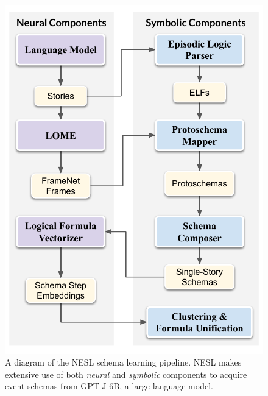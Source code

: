 



\begin{figure}
    \centering
    \includegraphics[]{figures/nesl/srw_architecture}
    \caption{A diagram of the NESL schema learning pipeline. NESL makes extensive use of both \textit{neural} and \textit{symbolic} components to acquire event schemas from GPT-J 6B, a large language model.}
    \label{fig:nesl_architecture}
\end{figure}

